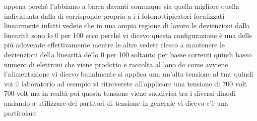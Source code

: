 appena perché l'abbiamo a barra davanti comunque sia quella migliore quella individuata dalla di corrisponde proprio a i i fotonottipicatori focalizzati linearmente infatti vedete che in una ampia regione di lavoro le devienzioni dalla linearità sono lo 0 per 100 ecco perché vi dicevo questa configurazione è una delle più adoverate effettivamente mentre le altre vedete riesco a mantenere le devienzioni della linearità dello 0 per 100 soltanto per basse correnti quindi basso numero di elettroni che viene prodotto e raccolta al lano do come avviene l'alimentazione vi dicevo banalmente si applica una un'alta tensione al tmt quindi voi il laboratorio ad esempio vi ritroverete all'applicare una tensione di 700 volt 700 volt ma in realtà poi questa tensione viene suddivisa tra i diversi dinodi andando a utilizzare dei partitori di tensione in generale vi dicevo c'è una particolare 

